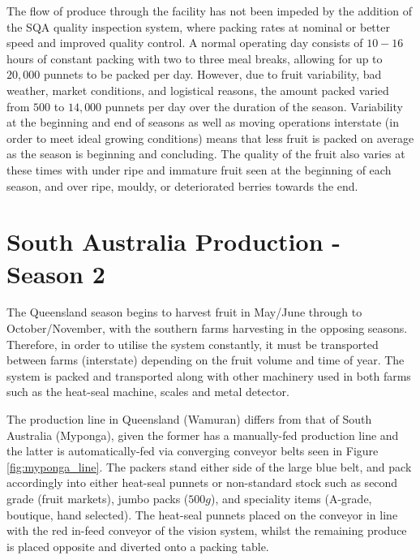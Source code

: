 \documentclass[fleqn,twoside,12pt]{report}
\begin{document}
The flow of produce through the facility has not been impeded by the addition of the SQA quality inspection system, where packing rates at nominal or better speed and improved quality control. A normal operating day consists of $10-16$ hours of constant packing with two to three meal breaks, allowing for up to $20,000$ punnets to be packed per day. However, due to fruit variability, bad weather, market conditions, and logistical reasons, the amount packed varied from $500$ to $14,000$ punnets per day over the duration of the season. Variability at the beginning and end of seasons as well as moving operations interstate (in order to meet ideal growing conditions) means that less fruit is packed on average as the season is beginning and concluding. The quality of the fruit also varies at these times with under ripe and immature fruit seen at the beginning of each season, and over ripe, mouldy, or deteriorated berries towards the end.




\section{South Australia Production - Season 2}

The Queensland season begins to harvest fruit in May/June through to October/November, with the southern farms harvesting in the opposing seasons. Therefore, in order to utilise the system constantly, it must be transported between farms (interstate) depending on the fruit volume and time of year. The system is packed and transported along with other machinery used in both farms such as the heat-seal machine, scales and metal detector. 

The production line in Queensland (Wamuran) differs from that of South Australia (Myponga), given the former has a manually-fed production line and the latter is automatically-fed via converging conveyor belts seen in Figure \ref{fig:myponga_line}. The packers stand either side of the large blue belt, and pack accordingly into either heat-seal punnets or non-standard stock such as second grade (fruit markets), jumbo packs ($500g$), and speciality items (A-grade, boutique, hand selected). The heat-seal punnets placed on the conveyor in line with the red in-feed conveyor of the vision system, whilst the remaining produce is placed opposite and diverted onto a packing table. 
\end{document}
